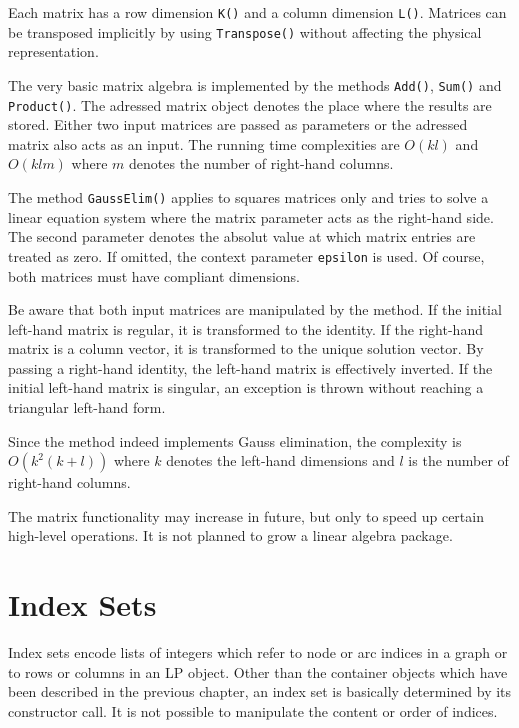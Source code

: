 \documentclass[a4paper,11pt,twoside]{book}
\begin{document}
\begin{multicols}{2}
Each matrix has a row dimension \verb/K()/ and a column dimension \verb/L()/.
Matrices can be transposed implicitly by using \verb/Transpose()/ without
affecting the physical representation.

The very basic matrix algebra is implemented by the methods \verb/Add()/,
\verb/Sum()/ and \verb/Product()/. The adressed matrix object denotes the
place where the results are stored. Either two input matrices are passed as
parameters or the adressed matrix also acts as an input. The running time
complexities are $O(kl)$ and $O(klm)$ where $m$ denotes the number of
right-hand columns.

The method \verb/GaussElim()/ applies to squares matrices only and tries to
solve a linear equation system where the matrix parameter acts as the
right-hand side. The second parameter denotes the absolut value at which matrix
entries are treated as zero. If omitted, the context parameter \verb/epsilon/
is used. Of course, both matrices must have compliant dimensions.

Be aware that both input matrices are manipulated by the method. If the
initial left-hand matrix is regular, it is transformed to the identity.
If the right-hand matrix is a column vector, it is transformed to the unique
solution vector. By passing a right-hand identity, the left-hand matrix is
effectively inverted. If the initial left-hand matrix is singular, an exception
is thrown without reaching a triangular left-hand form.

Since the method indeed implements Gauss elimination, the complexity is
$O(k^2(k+l))$ where $k$ denotes the left-hand dimensions and $l$ is the number
of right-hand columns.

The matrix functionality may increase in future, but only to speed up certain
high-level operations. It is not planned to grow a linear algebra package.


\cleardoublepage
{}
\chapter{Index Sets}
\thispagestyle{fancy}
\label{clb_index_set}

Index sets encode lists of integers which refer to node or arc indices in a
graph or to rows or columns in an LP object. Other than the container objects
which have been described in the previous chapter, an index set is basically
determined by its constructor call. It is not possible to manipulate the
content or order of indices.


\end{multicols}
\end{document}
